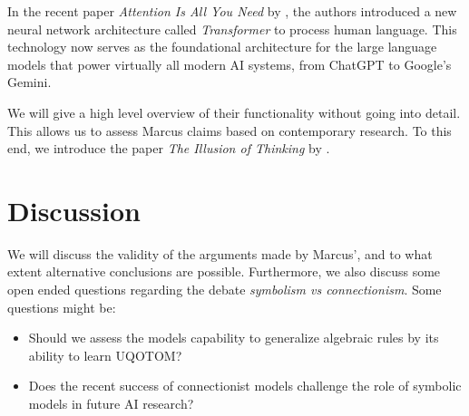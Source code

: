\documentclass{article}
\theoremstyle{plain}
\theoremstyle{definition}
\begin{document}

In the recent paper \emph{Attention Is All You Need} by \textcite{vaswani2017attention}, the authors introduced a new neural network architecture called \emph{Transformer} to process human language. This technology now serves as the foundational architecture for the large language models that power virtually all modern AI systems, from ChatGPT to Google's Gemini.

We will give a high level overview of their functionality without going into detail. This allows us to assess Marcus claims based on contemporary research. To this end, we introduce the paper \emph{The Illusion of Thinking} by \textcite{shojaee2025illusion}.


\section*{Discussion}
We will discuss the validity of the arguments made by Marcus', and to what extent alternative conclusions are possible. Furthermore, we also discuss some open ended questions regarding the debate \emph{symbolism vs connectionism}. Some questions might be:
\begin{itemize}
    \item Should we assess the models capability to generalize algebraic rules by its ability to learn UQOTOM?
    \item Does the recent success of connectionist models challenge the role of symbolic models in future AI research?
\end{itemize}


\printbibliography[title={References}]
\end{document}
